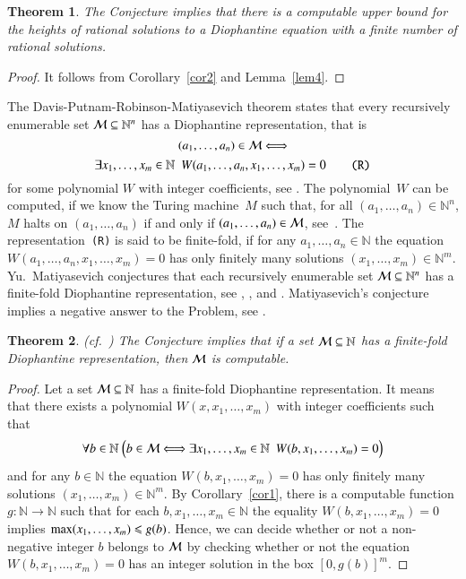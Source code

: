 \documentclass[conference]{IEEEtran}
\newtheorem{theorem}{Theorem}
\begin{document}
\begin{theorem}\label{the4}
The Conjecture implies that there is a computable upper bound for the heights of rational
solutions to a Diophantine equation with a finite number of rational solutions.
\end{theorem}
\begin{proof}
It follows from Corollary~\ref{cor2} and Lemma~\ref{lem4}.
\end{proof}
\par
The Davis-Putnam-Robinson-Matiyasevich theorem states that every recursively
enumerable set \mbox{${\cal M} \subseteq {\mathbb N}^n$} has a Diophantine
representation, that is
\[
(a_1,\ldots,a_n) \in {\cal M} \Longleftrightarrow
\]
\[
\exists x_1, \ldots, x_m \in {\mathbb N} ~~W(a_1,\ldots,a_n,x_1,\ldots,x_m)=0 \tag*{\texttt{(R)}}
\]
for some polynomial $W$ with integer coefficients, see \cite{Matiyasevich1}.
The polynomial~$W$ can be computed, if we know the Turing \mbox{machine $M$} such
that, for all \mbox{$(a_1,\ldots,a_n) \in {\mathbb N}^n$}, $M$ halts on \mbox{$(a_1,\ldots,a_n)$} if
and only if \mbox{$(a_1,\ldots,a_n) \in {\cal M}$}, \mbox{see \cite{Matiyasevich1}}.
The representation~\texttt{(R)} is said to be \mbox{finite-fold}, if for any
\mbox{$a_1,\ldots,a_n \in {\mathbb N}$} the equation
\mbox{$W(a_1,\ldots,a_n,x_1,\ldots,x_m)=0$} has only finitely many solutions
\mbox{$(x_1,\ldots,x_m) \in {\mathbb N}^m$}. \mbox{Yu. Matiyasevich} conjectures that
each recursively enumerable set \mbox{${\cal M} \subseteq {\mathbb N}^n$} has a
\mbox{finite-fold} Diophantine representation, see \mbox{\cite[pp.~341--342]{DMR}},
\mbox{\cite[p.~42]{Matiyasevich2}}, and \mbox{\cite[p.~745]{Matiyasevich3}}.
Matiyasevich's conjecture implies a negative answer to the Problem, see \mbox{\cite[p.~42]{Matiyasevich2}}.
\begin{theorem}\label{the5} (cf.~\cite[p.~721]{Tyszka2})
The Conjecture implies that if a set \mbox{${\cal M} \subseteq {\mathbb N}$} has a \mbox{finite-fold}
Diophantine representation, then ${\cal M}$ is computable.
\end{theorem}
\begin{proof}
Let a set \mbox{${\cal M} \subseteq {\mathbb N}$} has a \mbox{finite-fold} Diophantine representation.
It means that there exists a polynomial \mbox{$W(x,x_1,\ldots,x_m)$} with integer coefficients such that
\[
\forall b \in {\mathbb N}~ \Bigl(b \in {\cal M} \Longleftrightarrow \exists x_1, \ldots, x_m \in {\mathbb N} ~~W(b,x_1,\ldots,x_m)=0\Bigr)
\]
and for any \mbox{$b \in {\mathbb N}$} the equation \mbox{$W(b,x_1,\ldots,x_m)=0$} has only finitely many solutions
\mbox{$(x_1,\ldots,x_m) \in {\mathbb N}^m$}. By Corollary~\ref{cor1}, there is a computable function \mbox{$g:{\mathbb N} \to {\mathbb N}$}
such that for each \mbox{$b,x_1,\ldots,x_m \in {\mathbb N}$} the equality \mbox{$W(b,x_1,\ldots,x_m)=0$} implies
\mbox{${\rm max}(x_1,\ldots,x_m) \leqslant g(b)$}.
Hence, we can decide whether or not a \mbox{non-negative} integer $b$ belongs to ${\cal M}$ by checking
whether or not the equation \mbox{$W(b,x_1,\ldots,x_m)=0$} has an integer solution in the box \mbox{$[0,g(b)]^m$}.
\end{proof}
\end{document}
